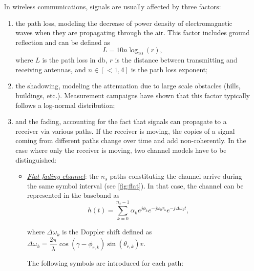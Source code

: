 \documentclass [a4paper, 11pt] {article}
\begin{document}
    \makesessiontitle

    \begin{reminder}

    In wireless communications, signals are usually affected by three factors:

    \begin{enumerate}
        \item the path loss, modeling the decrease of power density of electromagnetic waves when they are propagating through the air. This factor includes ground reflection and can be defined as
        \begin{equation}
            L = 10n\log_{10}(r),
        \end{equation}
        where $L$ is the path loss in \si{\decibel}, $r$ is the distance between transmitting and receiving antennas, and $n \in [<1,4]$ is the path loss exponent;
        \item the shadowing, modeling the attenuation due to large scale obstacles (hills, buildings, etc.). Measurement campaigns have shown that this factor typically follows a log-normal distribution;
        \item and the fading, accounting for the fact that signals can propagate to a receiver via various paths. If the receiver is moving, the copies of a signal coming from different paths change over time and add non-coherently. In the case where only the receiver is moving, two channel models have to be distinguished:

        \begin{itemize}
            \item \underline{\textit{Flat fading channel}}: the $n_s$ paths constituting the channel arrive during the same symbol interval (see \autoref{fig:flat}). In that case, the channel can be represented in the baseband as
            \begin{equation}
                h(t) = \sum_{k=0}^{n_s - 1} \alpha_k e^{j\phi_k}e^{-j\omega_0 \tau_k}
                e^{-j\Delta \omega_k t},
            \end{equation}

        where $\Delta \omega_k$ is the Doppler shift defined as
        $\Delta \omega_k = \dfrac{2\pi}{\lambda}\cos(\gamma - \phi_{r,k})\sin(\theta_{r,k})v$.

        The following symbols are introduced for each path:


\end{itemize}
\end{enumerate}
\end{reminder}
\end{document}

